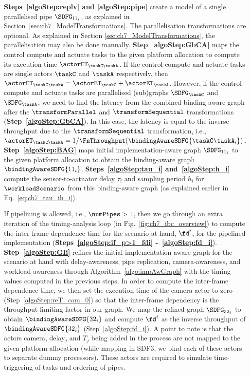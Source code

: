 \textbf{Steps~\ref{algoStep:replv} and \ref{algoStep:pipe}} create a model of a single parallelised pipe $\SDFG_{11_i}$, as explained in Section~\ref{sec:ch7_ModelTransformations}. 
The parallelisation transformations are optional.
As explained in Section \ref{sec:ch7_ModelTransformations}, the parallelisation may also be done manually.
\textbf{Step~\ref{algoStep:GbCA}} maps the control compute and actuate tasks to the given platform allocation to compute its execution time $\actorET_{\taskC\taskA}$.
If the control compute and actuate tasks are single actors $\taskC$ and $\taskA$ respectively, then $\actorET_{\taskC\taskA}=\actorET_\taskC+\actorET_\taskA$.
However, if the control compute and actuate tasks are parallelised (sub)graphs $\SDFG_\taskC$ and $\SDFG_\taskA$, we need to find the latency from the combined binding-aware graph after the $\transformParallel$ and $\transformSequential$ transformations (\textbf{Step~\ref{algoStep:GbCA}}).
In this case, the latency is equal to the inverse throughput due to the $\transformSequential$ transformation, i.e., $\actorET_{\taskC\taskA}=1/\FnThroughput(\bindingAwareSDFG{\taskC\taskA_i})$.
\textbf{Step~\ref{algoStep:BAG}} maps initial implementation-aware graph $\SDFG_{11_i}$ to the given platform allocation to obtain the binding-aware graph $\bindingAwareSDFG{11_i}$. 
\textbf{Steps~\ref{algoStep:tau_i} and~\ref{algoStep:h_i}} compute the sensor-to-actuator delay $\tau_i$ and sampling period $h_i$ for $\workloadScenario$ from this binding-aware graph (as explained earlier in Eq.~\ref{eq:ch7_tau_ih_i}).

If pipelining is allowed, i.e., $\numPipes>1$, then we go through an extra iteration of the timing-analysis loop (in Fig.~\ref{fig:ch7_ibc_overview}) to compute the inter-frame dependence time for the scenario at hand, $\fd^i$, for the pipelined implementation (\textbf{Steps~\ref{algoStep:if_p>1_fdi} -~\ref{algoStep:fd_i}}).
\textbf{Step~\ref{algoStep:GIi}} refines the initial implementation-aware graph for the scenario at hand with delay-awareness, pipe replication, camera-awareness, and workload-awareness through Algorithm~\ref{algo:impAwGraph} with the timing values computed in the previous steps.
In order to compute the inter-frame dependence time, we then set the execution time of the camera actor to zero (Step~\ref{algoStep:reT_cam_0}) so that the inter-frame dependency is the throughput limiting factor in our graph.
We map the refined graph $\SDFG_{32_i}$ to obtain $\bindingAwareSDFG{32_i}$ and compute $\fd^i$ as the inverse throughput of $\bindingAwareSDFG{32_i}$ (Step~\ref{algoStep:fd_i}). 
A point to note is that the actors camera, delay$_j$ and $T_j$ being added in the process are not mapped to the given platform allocation (while mapping in SDF3, we bind each of these actors to separate dummy processors). These actors are required to simulate time-triggering of tasks and ordering of pipes.

